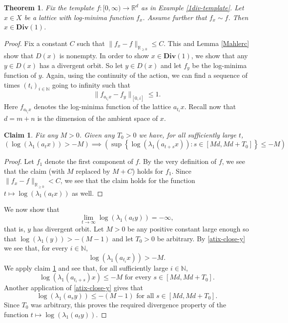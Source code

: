 \documentclass[reqno,11pt]{amsart}
\theoremstyle{plain}
\newtheorem{thm}{Theorem}[section]
\newtheorem{claim}{Claim}[thm]
\theoremstyle{definition}
\theoremstyle{remark}
\numberwithin{equation}{section}
\newcommand{\D}{\mathbf{Div}}
\newcommand{\R}{{\mathbb{R}}}
\newcommand{\N}{{\mathbb{N}}}
\begin{document}
\begin{thm}\label{1template-is-actually-1template}
Fix the template $f:[0,\infty) \to \R^d$ as in Example \ref{1div-template}. Let $x \in X$ be a lattice with log-minima function $f_x$.
Assume further that $f_x \sim f$. Then $x \in \D(1)$.
\end{thm}
\begin{proof}
Fix a constant $C$ such that $\|f_x -f\|_{\R_{\geq 0}} \leq C$.
This and Lemma \ref{Mahlerc} show that $D(x)$ is nonempty. In order to show $x \in \D(1)$, we show that any $y \in D(x)$ has a divergent orbit. So let $y \in D(x)$ and let $f_y$ be the log-minima function of $y$.
Again, using the continuity of the action, we can find a sequence of times $(t_i)_{i \in \N}$ going to infinity such that
\begin{equation}\label{atix-close-y}
    \|f_{a_{t_i}x} - f_y\|_{[0,i]} \leq 1.
\end{equation}
Here $f_{a_{t_i}x}$ denotes the log-minima function of the lattice $a_{t_i}x$.
Recall now that $d=m+n$ is the dimension of the ambient space of $x$.
\begin{claim}\label{1Div-claim}
Fix any $M>0$.
Given any $T_0>0$ we have, for all sufficiently large $t$,
\begin{equation}\label{x-leaves-K-for-long-after-finite-time}
    \left(\log(\lambda_1(a_tx)) > -M\right) \implies \left(\sup \left\lbrace \log(\lambda_1(a_{t+s} x)) : s \in  [Md, Md + T_0]\right\rbrace  \leq -M\right)
\end{equation}
\end{claim}
\begin{proof}
Let $f_1$ denote the first component of $f$. 
By the very definition of $f$, we see that the claim (with $M$ replaced by $M+C$) holds for $f_1$.
Since $\|f_x -f\|_{\R_{\geq 0}} < C$, we see that the claim holds for the function $t\mapsto \log(\lambda_1(a_tx))$ as well.
\end{proof}
We now show that 
\begin{equation*}
    \lim_{t\to \infty} \log(\lambda_1(a_ty)) = -\infty,
\end{equation*}
that is, $y$ has divergent orbit.
Let $M>0$ be any positive constant large enough so that $\log(\lambda_1(y)) > -(M-1)$ and let $T_0>0$ be arbitrary. 
By \eqref{atix-close-y} we see that, for every $i \in \N$,
\begin{equation*}
    \log(\lambda_1(a_{t_i} x)) > -M.
\end{equation*}
We apply claim \ref{1Div-claim} and see that, for all sufficiently large $i \in \N$, 
\begin{equation*}
    \log(\lambda_1(a_{t_i+s}) x)  \leq -M \text{ for every } s \in [Md,Md+T_0].
\end{equation*}
Another application of \eqref{atix-close-y} gives that
\begin{equation*}
\log(\lambda_1(a_sy)) \leq -(M-1) \text{ for all } s \in [Md, Md+T_0].
\end{equation*}
Since $T_0$ was arbitrary, this proves the required divergence property of the function $t\mapsto \log(\lambda_1(a_ty))$.
\end{proof}
\end{document}
